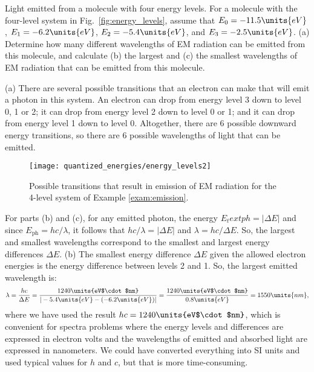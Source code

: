 \begin{example}{Light emitted from a molecule with four energy levels.}
\label{exam:emission}
For a molecule with the four-level system in Fig.~\ref{fig:energy_levels}, 
assume that $E_0 = -11.5\units{eV}$, $E_1=-6.2\units{eV}$, 
$E_2 = -5.4\units{eV}$, and $E_3 = -2.5\units{eV}$. 
(a) Determine how many different wavelengths of EM
radiation can be emitted from this molecule, and calculate (b) the 
largest and (c) the smallest wavelengths of
EM radiation that can be emitted from this molecule.

\begin{solution}
(a) There are several possible transitions that an 
electron can make that will emit a photon in this system. An electron
can drop from energy level 3 down to level 0, 1 or 2; it can drop
from energy level 2 down to level 0 or 1; and it can drop from
energy level 1 down to level 0. Altogether, there are 6 possible
downward energy transitions, so there are 6 possible wavelengths of
light that can be emitted. 

\begin{figure}[!t]
\begin{center}
\texttt{[image: quantized\_energies/energy\_levels2]}
\end{center}
\caption{Possible transitions that result in emission of EM radiation
for the 4-level system of Example \ref{exam:emission}.}
\label{fig:energy_levels2}
\end{figure}
For parts (b) and (c), for any emitted photon, the energy 
$E_text{ph} = |\Delta E|$ and since $E_\text{ph} = hc/\lambda$, 
it follows that $hc/\lambda = |\Delta E|$ and
$\lambda = hc/\Delta E$. So, the largest and smallest wavelengths
correspond to the smallest and largest energy differences $\Delta E$.
(b) The smallest energy difference $\Delta E$ given the allowed electron
energies is the energy difference between levels 2 and 1. So, the largest
emitted wavelength is:
\begin{equation}
\lambda = \frac{hc}{\Delta E} 
        = \frac{1240 \units{eV$\cdot$nm}}{|-5.4 \units{eV} 
               - (-6.2 \units{eV})|} 
        = \frac{1240 \units{eV$\cdot$nm}}{0.8 \units{eV}} = 1550 \units{nm}, 
\end{equation}
where we have used the result $hc = 1240\units{eV$\cdot$nm}$, 
which is convenient for 
spectra problems where the energy levels and differences are expressed
in electron volts and the wavelengths of emitted and absorbed light are 
expressed in nanometers. We could have converted everything into SI units
and used typical values for $h$ and $c$, but that is more time-consuming.


\end{solution}
\end{example}
